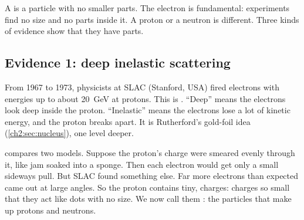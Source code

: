A  is a particle with no smaller parts. The electron is
fundamental: experiments find no size and no parts inside it. A proton or a neutron is
different. Three kinds of evidence show that they have parts.

\subsection{Evidence 1: deep inelastic scattering}

From 1967 to 1973, physicists at SLAC (Stanford, USA) fired electrons with energies up
to about \qty{20}{GeV} at protons. This is . ``Deep''
means the electrons look deep inside the proton. ``Inelastic'' means the electrons lose
a lot of kinetic energy, and the proton breaks apart. It is Rutherford's gold-foil idea
(\cref{ch2:sec:nucleus}), one level deeper.

 compares two models. Suppose the proton's charge were smeared evenly
through it, like jam soaked into a sponge. Then each electron would get only a small
sideways pull. But SLAC found something else. Far more electrons than expected came out
at large angles. So the proton contains tiny, 
charges: charges so small that they act like dots with no size. We now call them
: the particles that make up protons and neutrons.

